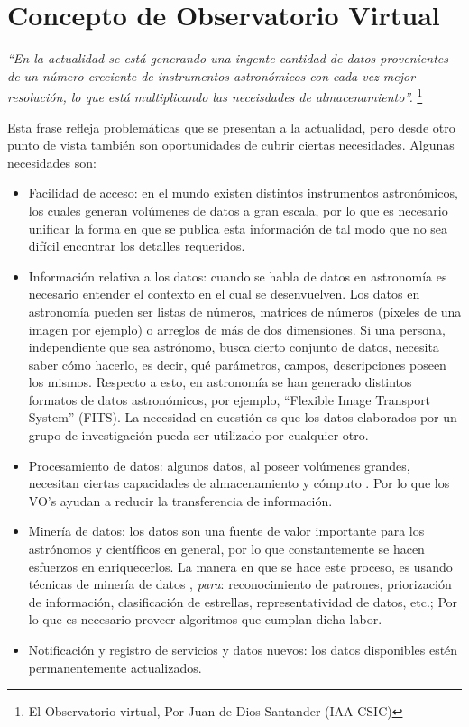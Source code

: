 \section{Concepto de Observatorio Virtual}

\emph{``En la actualidad se está generando una ingente cantidad de datos
provenientes de un número creciente de instrumentos astronómicos con cada vez
mejor resolución, lo que está multiplicando las neceisdades de almacenamiento''.}
\footnote{El Observatorio virtual, Por Juan de Dios Santander (IAA-CSIC)}

Esta frase refleja problemáticas que se presentan a la actualidad, pero desde
otro punto de vista también son oportunidades de cubrir ciertas necesidades.
Algunas necesidades son:

\begin{itemize}
	\item Facilidad de acceso: en el mundo existen distintos instrumentos
		astronómicos, los cuales generan volúmenes de datos a gran escala,
		por lo que es necesario unificar la forma en que se publica esta información
		de tal modo que no sea difícil encontrar los detalles requeridos.
	\item Información relativa a los datos: cuando se habla de datos en
		astronomía es necesario entender el contexto en el cual se desenvuelven.
		Los datos en astronomía pueden ser listas de números, matrices de números
		(píxeles de una imagen por ejemplo) o arreglos de más de dos dimensiones.
		Si una persona, independiente que sea astrónomo, busca cierto
		conjunto de datos, necesita saber cómo hacerlo, es decir,
		qué parámetros, campos, descripciones poseen los mismos.
		Respecto a esto, en astronomía se han generado distintos formatos
		de datos astronómicos, por ejemplo, ``Flexible Image Transport System''\cite{fits_definition}
		(FITS).	La necesidad en cuestión es que los datos elaborados por un grupo de
		investigación pueda ser utilizado por cualquier otro.
	\item Procesamiento de datos: algunos datos, al poseer volúmenes grandes,
		necesitan ciertas capacidades de almacenamiento \cite{archive_tsunami} y cómputo \cite{data_hpc}.
		Por lo que los VO's ayudan a reducir la transferencia de información.
	\item Minería de datos: los datos son una fuente de valor importante para los
		astrónomos y científicos en general, por lo que constantemente se hacen esfuerzos
		en enriquecerlos. La manera en que se hace este proceso, es usando técnicas de 
		minería de datos \cite{vo_data_mining}, \emph{para}: reconocimiento de patrones, priorización
		de información, clasificación de estrellas, representatividad de datos, etc.;
		Por lo que es necesario proveer algoritmos que cumplan dicha labor.
	\item Notificación y registro de servicios y datos nuevos: los datos
		disponibles estén permanentemente actualizados.
\end{itemize}

